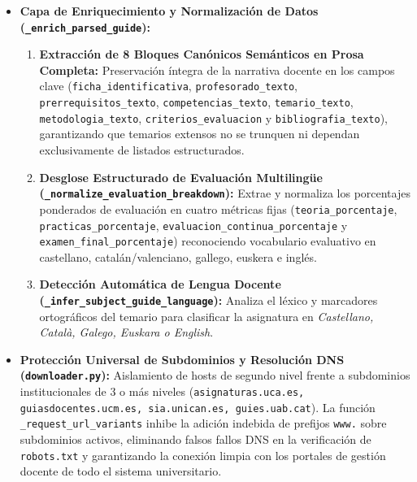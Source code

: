 \begin{itemize}
    \begin{enumerate}
        \item \texttt{parse\_tabular\_subject\_guide}: Extrae guías con estructura tabular clásica (metadatos, departamentos, áreas de conocimiento, tablas \texttt{\#temario} y \texttt{\#procedimientos\_evaluacion}).
        \item \texttt{parse\_generic\_eees\_subject\_guide}: Interpreta bloques temáticos semánticos en HTML (Requisitos Previos, Contenidos, Evaluación, Competencias, Bibliografía, Emails de Profesorado) con soporte multilingüe y extracción de porcentajes evaluativos por procesamiento de lenguaje natural en texto continuo.
        \item \texttt{parse\_subject\_guide\_pdf\_stream}: Procesa flujos de PDF en memoria RAM mediante \texttt{pypdf} y OCR condicional con \texttt{pypdfium2}.
    \end{enumerate}
    \item \textbf{Capa de Enriquecimiento y Normalización de Datos (\texttt{\_enrich\_parsed\_guide}):}
    \begin{enumerate}
        \item \textbf{Extracción de 8 Bloques Canónicos Semánticos en Prosa Completa:} Preservación íntegra de la narrativa docente en los campos clave (\texttt{ficha\_identificativa}, \texttt{profesorado\_texto}, \texttt{prerrequisitos\_texto}, \texttt{competencias\_texto}, \texttt{temario\_texto}, \texttt{metodologia\_texto}, \texttt{criterios\_evaluacion} y \texttt{bibliografia\_texto}), garantizando que temarios extensos no se trunquen ni dependan exclusivamente de listados estructurados.
        \item \textbf{Desglose Estructurado de Evaluación Multilingüe (\texttt{\_normalize\_evaluation\_breakdown}):} Extrae y normaliza los porcentajes ponderados de evaluación en cuatro métricas fijas (\texttt{teoria\_porcentaje}, \texttt{practicas\_porcentaje}, \texttt{evaluacion\_continua\_porcentaje} y \texttt{examen\_final\_porcentaje}) reconociendo vocabulario evaluativo en castellano, catalán/valenciano, gallego, euskera e inglés.
        \item \textbf{Detección Automática de Lengua Docente (\texttt{\_infer\_subject\_guide\_language}):} Analiza el léxico y marcadores ortográficos del temario para clasificar la asignatura en \emph{Castellano, Català, Galego, Euskara o English}.
    \end{enumerate}
    \item \textbf{Protección Universal de Subdominios y Resolución DNS (\texttt{downloader.py}):} Aislamiento de hosts de segundo nivel frente a subdominios institucionales de 3 o más niveles (\texttt{asignaturas.uca.es, guiasdocentes.ucm.es, sia.unican.es, guies.uab.cat}). La función \texttt{\_request\_url\_variants} inhibe la adición indebida de prefijos \texttt{www.} sobre subdominios activos, eliminando falsos fallos DNS en la verificación de \texttt{robots.txt} y garantizando la conexión limpia con los portales de gestión docente de todo el sistema universitario.

\end{itemize}
